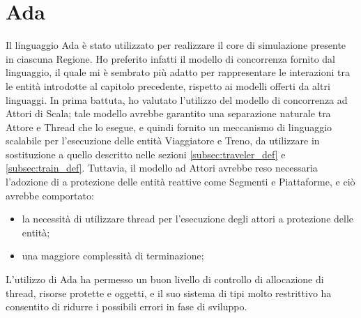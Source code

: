 	\section{Ada}
		Il linguaggio Ada è stato utilizzato per realizzare il core di simulazione presente in ciascuna Regione. Ho preferito infatti il modello di concorrenza fornito dal linguaggio, il quale mi è sembrato più adatto per rappresentare le interazioni tra le entità introdotte al capitolo precedente, rispetto ai modelli offerti da altri linguaggi. 
		In prima battuta, ho valutato l'utilizzo del modello di concorrenza ad Attori di Scala; tale modello avrebbe garantito una separazione naturale tra Attore e Thread che lo esegue, e quindi fornito un meccanismo di linguaggio scalabile per l'esecuzione delle entità Viaggiatore e Treno, da utilizzare in sostituzione a quello descritto nelle sezioni \ref{subsec:traveler_def} e \ref{subsec:train_def}. Tuttavia, il modello ad Attori avrebbe reso necessaria l'adozione di  a protezione delle entità reattive come Segmenti e Piattaforme, e ciò avrebbe comportato:
			\begin{itemize}
				\item la necessità di utilizzare thread per l'esecuzione degli attori a protezione delle entità;
				\item una maggiore complessità di terminazione;
			\end{itemize}
		L'utilizzo di Ada ha permesso un buon livello di controllo di allocazione di thread, risorse protette e oggetti, e il suo sistema di tipi molto restrittivo ha consentito di ridurre i possibili errori in fase di sviluppo.
	
